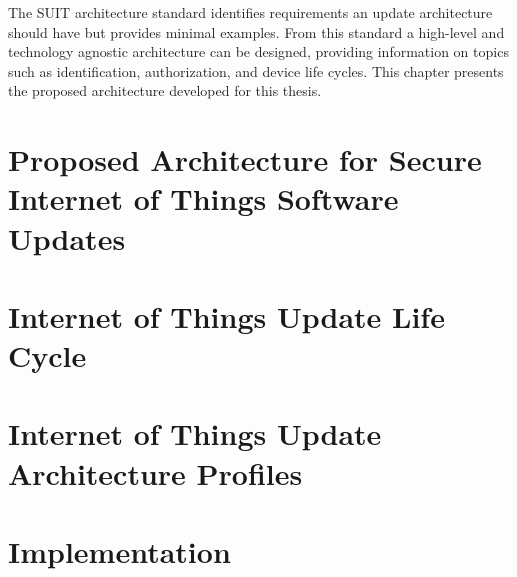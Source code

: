 \documentclass[0-thesis.tex]{subfiles}
\begin{document}
The SUIT architecture standard identifies requirements an update architecture should have
but provides minimal examples. From this standard a high-level and technology agnostic
architecture can be designed, providing information on topics such as identification,
authorization, and device life cycles. This chapter presents the proposed architecture
developed for this thesis.


\section{Proposed Architecture for Secure Internet of Things Software Updates}


\section{Internet of Things Update Life Cycle}


\section{Internet of Things Update Architecture Profiles}


\section{Implementation}

\end{document}
